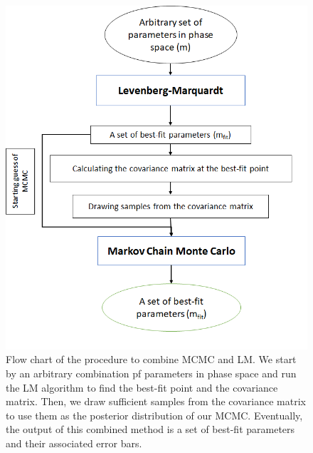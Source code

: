 \documentclass[12pt, TexShade, letterpaper]{report}
\begin{document}
\begin{figure}[h!]
\centering
\includegraphics[scale =0.9]{combined_flow.png}
\caption[Flow chart of the procedure to combine MCMC and LM]{Flow chart of the procedure to combine MCMC and LM. We start by an arbitrary combination pf parameters in phase space and run the LM algorithm to find the best-fit point and the covariance matrix. Then, we draw sufficient samples from the covariance matrix to use them as the posterior distribution of our MCMC. Eventually, the output of this combined method is a set of best-fit parameters and their associated error bars.}
\label{fig:combined_flow}
\end{figure}
\end{document}
